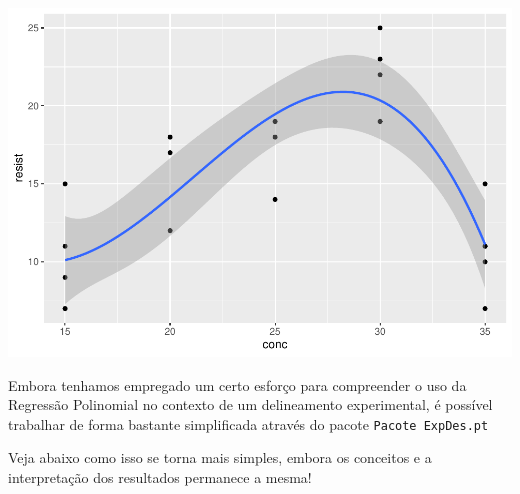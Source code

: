 \documentclass[
]{book}
\newenvironment{Shaded}{\begin{snugshade}}{\end{snugshade}}
\newcommand{\AttributeTok}[1]{\textcolor[rgb]{0.13,0.29,0.53}{#1}}
\newcommand{\CommentTok}[1]{\textcolor[rgb]{0.56,0.35,0.01}{\textit{#1}}}
\newcommand{\ConstantTok}[1]{\textcolor[rgb]{0.56,0.35,0.01}{#1}}
\newcommand{\FunctionTok}[1]{\textcolor[rgb]{0.13,0.29,0.53}{\textbf{#1}}}
\newcommand{\NormalTok}[1]{#1}
\newcommand{\SpecialCharTok}[1]{\textcolor[rgb]{0.81,0.36,0.00}{\textbf{#1}}}
\begin{document}
\includegraphics[width=0.5\linewidth]{_main_files/figure-latex/graph4-1}

Embora tenhamos empregado um certo esforço para compreender o uso da Regressão Polinomial no contexto de um delineamento experimental, é possível trabalhar de forma bastante simplificada através do pacote \texttt{Pacote\ ExpDes.pt}

Veja abaixo como isso se torna mais simples, embora os conceitos e a interpretação dos resultados permanece a mesma!

\begin{Shaded}
\end{Shaded}
\end{document}
